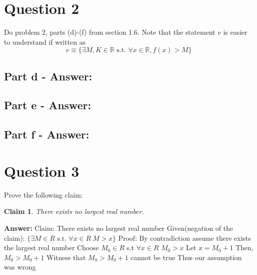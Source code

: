 \documentclass[12pt]{article}
\newtheorem*{claim}{Claim}
\begin{document}
\newpage
\section*{Question 2}

Do problem 2, parts (d)-(f) from section 1.6. Note that the statement $v$ is easier to understand if written as
\[
v\equiv\{\exists M,K\in\mathbb{R}\text{ s.t. }\forall x\in\mathbb{R}, f(x)>M\}
\]
\subsection*{Part d - Answer:}

\subsection*{Part e - Answer:}

\subsection*{Part f - Answer:}

\newpage
\section*{Question 3}

Prove the following claim:
\begin{claim}
There exists no largest real number.
\end{claim}

{\noindent\bf Answer:}
{
 \newline
 \newline
Claim: There exists no largest real number\newline
 \newline
Given(negation of the claim):  $\{\exists M\in R\text{ s.t. } \forall x\in R\ M>x \}$\newline
 \newline
Proof: By contradiction assume there exists the largest real number\newline
 \newline
Choose $M_{0}\in R$ s.t $\forall x\in R$ $M_{0}>x$\newline
 \newline
Let $x=M_{0}+1$\newline
 \newline
Then, $M_{0}>M_{0}+1$\newline
 \newline
Witness that $M_{0}>M_{0}+1$ cannot be true\newline
 \newline
Thus our assumption was wrong\newline
}
\end{document}
